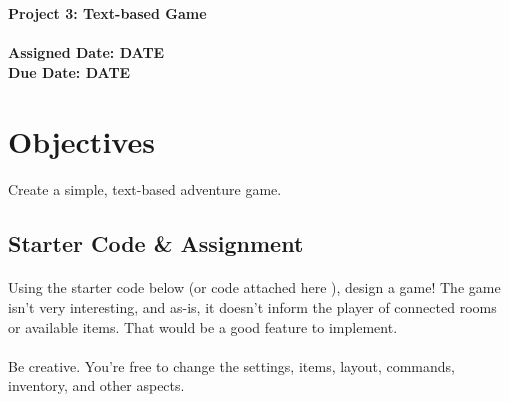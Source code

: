 \documentclass[letter,10pt]{article}
\begin{document}
    
    \huge
    \textbf{Project 3: Text-based Game}
    \normalsize
    \\ ~~ \\
    \textbf{Assigned Date: DATE} \\
    \textbf{Due Date: DATE}
    
    \section*{Objectives}
    \paragraph{}Create a simple, text-based adventure game.
    
    \subsection*{Starter Code \& Assignment}
    \paragraph{}Using the starter code below (or code attached here ), design a game! The game isn't very interesting, and as-is, it doesn't inform the player of connected rooms or available items. That would be a good feature to implement.
    
    \paragraph{}Be creative. You're free to change the settings, items, layout, commands, inventory, and other aspects.
    
\end{document}

